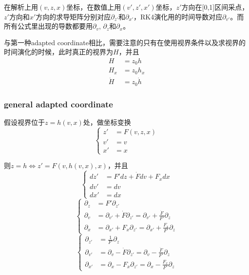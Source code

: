 \documentclass[12pt,a4paper]{ctexart}
\numberwithin{equation}{section}
\begin{document}
在解析上用$(v,z,x)$坐标，在数值上用$(v',z',x')$坐标，$z'$方向在[0,1]区间采点，$z'$方向和$x'$方向的求导矩阵分别对应$\partial_{z'}$和$\partial_{x'}$，RK4演化用的时间导数对应$\partial_{v'}$。而所有公式里出现的导数都要用$\partial_v$, $\partial_z$和$\partial_x$。

与第一种adapted coordinate相比，需要注意的只有在使用视界条件以及求视界的时间演化的时候，此时真正的视界为$H$，并且
\begin{equation}
    \begin{aligned}
        H&=z_0 h\\
        H_x&=z_0 h_x\\
        \dot{H}&=z_0 \dot{h}
    \end{aligned}
\end{equation}

\subsubsection{general adapted coordinate}

假设视界位于$z=h(v,x)$处，做坐标变换
\begin{equation}
    \left\{
        \begin{aligned}
            z'&=F(v,z,x)\\
            v'&=v\\
            x'&=x
        \end{aligned}
    \right.
\end{equation}

则$z=h\Leftrightarrow z'=F(v,h(v,x),x)$，并且
\begin{equation}
    \left\{
        \begin{aligned}
            dz'&=F'dz+\dot{F}dv+F_xdx\\
            dv'&=dv\\
            dx'&=dx
        \end{aligned}
    \right.
\end{equation}
\begin{equation}
    \left\{
        \begin{aligned}
            \partial_z&=F'\partial_{z'}\\
            \partial_v&=\partial_{v'}+\dot{F}\partial_{z'}=\partial_{v'}+\frac{\dot{F}}{F'}\partial_z\\
            \partial_x&=\partial_{x'}+F_x\partial_{z'}=\partial_{x'}+\frac{F_x}{F'}\partial_z
        \end{aligned}
    \right.
\end{equation}
\begin{equation}
    \left\{
        \begin{aligned}
            \partial_{z'}&=\frac{1}{F'}\partial_z\\
            \partial_{v'}&=\partial_v-\dot{F}\partial_{z'}=\partial_v-\frac{\dot{F}}{F'}\partial_z\\
            \partial_{x'}&=\partial_x-F_x\partial_{z'}=\partial_x-\frac{F_x}{F'}\partial_z
        \end{aligned}
    \right.
\end{equation}
\end{document}
